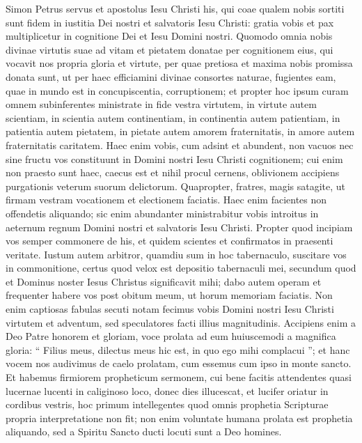 \begin{biblechapter}
 \verse Simon Petrus servus et apostolus Iesu Christi his, qui coae qualem nobis sortiti sunt fidem in iustitia Dei nostri et salvatoris Iesu Christi: 
\verse gratia vobis et pax multiplicetur in cognitione Dei et Iesu Domini nostri.
 \verse Quomodo omnia nobis divinae virtutis suae ad vitam et pietatem donatae per cognitionem eius, qui vocavit nos propria gloria et virtute, 
\verse per quae pretiosa et maxima nobis promissa donata sunt, ut per haec efficiamini divinae consortes naturae, fugientes eam, quae in mundo est in concupiscentia, corruptionem; 
\verse et propter hoc ipsum curam omnem subinferentes ministrate in fide vestra virtutem, in virtute autem scientiam, 
\verse in scientia autem continentiam, in continentia autem patientiam, in patientia autem pietatem, 
\verse in pietate autem amorem fraternitatis, in amore autem fraternitatis caritatem. 
\verse Haec enim vobis, cum adsint et abundent, non vacuos nec sine fructu vos constituunt in Domini nostri Iesu Christi cognitionem; 
\verse cui enim non praesto sunt haec, caecus est et nihil procul cernens, oblivionem accipiens purgationis veterum suorum delictorum. 
\verse Quapropter, fratres, magis satagite, ut firmam vestram vocationem et electionem faciatis. Haec enim facientes non offendetis aliquando; 
\verse sic enim abundanter ministrabitur vobis introitus in aeternum regnum Domini nostri et salvatoris Iesu Christi.
 \verse Propter quod incipiam vos semper commonere de his, et quidem scientes et confirmatos in praesenti veritate. 
\verse Iustum autem arbitror, quamdiu sum in hoc tabernaculo, suscitare vos in commonitione, 
\verse certus quod velox est depositio tabernaculi mei, secundum quod et Dominus noster Iesus Christus significavit mihi; 
\verse dabo autem operam et frequenter habere vos post obitum meum, ut horum memoriam faciatis.
 \verse Non enim captiosas fabulas secuti notam fecimus vobis Domini nostri Iesu Christi virtutem et adventum, sed speculatores facti illius magnitudinis. 
 \verse Accipiens enim a Deo Patre honorem et gloriam, voce prolata ad eum huiuscemodi a magnifica gloria: “ Filius meus, dilectus meus hic est, in quo ego mihi complacui ”; 
\verse et hanc vocem nos audivimus de caelo prolatam, cum essemus cum ipso in monte sancto. 
\verse Et habemus firmiorem propheticum sermonem, cui bene facitis attendentes quasi lucernae lucenti in caliginoso loco, donec dies illucescat, et lucifer oriatur in cordibus vestris, 
\verse hoc primum intellegentes quod omnis prophetia Scripturae propria interpretatione non fit; 
\verse non enim voluntate humana prolata est prophetia aliquando, sed a Spiritu Sancto ducti locuti sunt a Deo homines.
 

\end{biblechapter}
